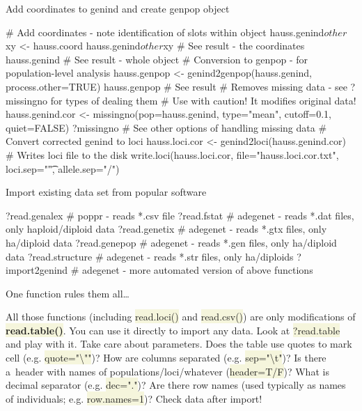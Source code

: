 \documentclass[compress, ucs, xelatex, 11pt, xcolor=svgnames, aspectratio=169,
	hyperref={
		bookmarks=true,
		unicode=true,
		colorlinks=true,
		pdftitle={Molecular data in R},
		plainpages=false,
		pdfauthor={Vojtech Zeisek},
		pdfsubject={Course about phylogeny and evolution in R},
		pdfcreator={XeLaTeX},
		pdfkeywords={R, evolution, phylogeny, molecular data},
		linkcolor=Crimson, %
		anchorcolor=Magenta, %
		citecolor=Magenta, %
		filecolor=Magenta, %
		menucolor=Magenta, %
		urlcolor=DodgerBlue, %
		pdftex},
	url={hyphens, lowtilde} %
	]{beamer}
\renewcommand{\texttt}[1]{\colorbox{Beige}{{\ttfamily #1}}}
\begin{document}
\begin{frame}[fragile]{Add coordinates to genind and create genpop object}
	\begin{spluscode}
    # Add coordinates - note identification of slots within object
    hauss.genind$other$xy <- hauss.coord
    hauss.genind$other$xy # See result - the coordinates
    hauss.genind # See result - whole object
    # Conversion to genpop - for population-level analysis
    hauss.genpop <- genind2genpop(hauss.genind, process.other=TRUE)
    hauss.genpop # See result
    # Removes missing data - see ?missingno for types of dealing them
    # Use with caution! It modifies original data!
    hauss.genind.cor <- missingno(pop=hauss.genind, type="mean", cutoff=0.1,
      quiet=FALSE)
    ?missingno # See other options of handling missing data
    # Convert corrected genind to loci
    hauss.loci.cor <- genind2loci(hauss.genind.cor)
    # Writes loci file to the disk
    write.loci(hauss.loci.cor, file="hauss.loci.cor.txt", loci.sep="\t",
      allele.sep="/")
	\end{spluscode}
\end{frame}

\begin{frame}[fragile]{Import existing data set from popular software}
	\begin{spluscode}
    ?read.genalex # poppr - reads *.csv file
    ?read.fstat # adegenet - reads *.dat files, only haploid/diploid data
    ?read.genetix # adegenet - reads *.gtx files, only ha/diploid data
    ?read.genepop # adegenet - reads *.gen files, only ha/diploid data
    ?read.structure # adegenet - reads *.str files, only ha/diploids
    ?import2genind # adegenet - more automated version of above functions
	\end{spluscode}
	\begin{alertblock}{One function rules them all\ldots}
		\begin{footnotesize}
			All those functions (including \texttt{read.loci()} and \texttt{read.csv()}) are only modifications of \textbf{\texttt{read.table()}}. You can use it directly to import any data. Look at \texttt{?read.table} and play with it. Take care about parameters. Does the table use quotes to mark cell (e.g. \texttt{quote="\textbackslash ""})? How are columns separated (e.g. \texttt{sep="\textbackslash t"})? Is there a~header with names of populations/loci/whatever (\texttt{header=T/F})? What is decimal separator (e.g. \texttt{dec="."})? Are there row names (used typically as names of individuals; e.g. \texttt{row.names=1})? \alert{Check data after import!}
		\end{footnotesize}
	\end{alertblock}
\end{frame}
\end{document}

